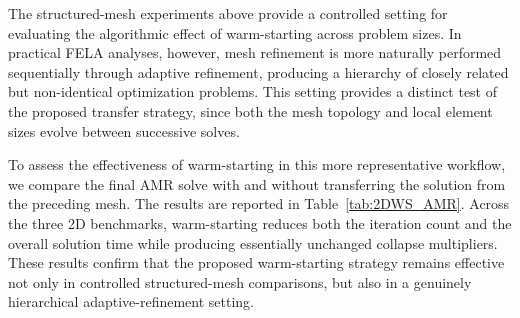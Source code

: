 The structured-mesh experiments above provide a controlled setting for evaluating the algorithmic effect of warm-starting across problem sizes. In practical FELA analyses, however, mesh refinement is more naturally performed sequentially through adaptive refinement, producing a hierarchy of closely related but non-identical optimization problems. This setting provides a distinct test of the proposed transfer strategy, since both the mesh topology and local element sizes evolve between successive solves.

To assess the effectiveness of warm-starting in this more representative workflow, we compare the final AMR solve with and without transferring the solution from the preceding mesh. The results are reported in Table~\ref{tab:2DWS_AMR}. Across the three 2D benchmarks, warm-starting reduces both the iteration count and the overall solution time while producing essentially unchanged collapse multipliers. These results confirm that the proposed warm-starting strategy remains effective not only in controlled structured-mesh comparisons, but also in a genuinely hierarchical adaptive-refinement setting.




